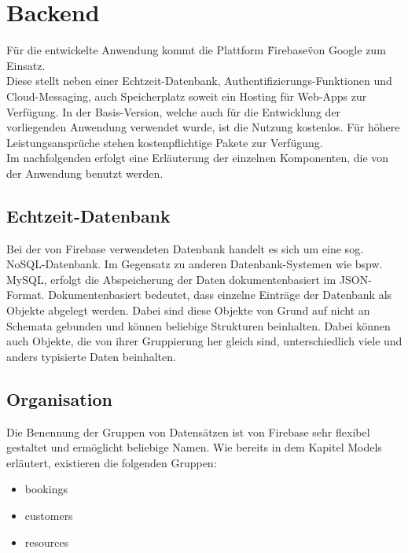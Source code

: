 \chapter{Backend}
Für die entwickelte Anwendung kommt die Plattform \"Firebase\" von Google zum Einsatz.
\\
Diese stellt neben einer Echtzeit-Datenbank, Authentifizierungs-Funktionen und Cloud-Messaging, auch Speicherplatz soweit ein Hosting für Web-Apps zur Verfügung.
In der Basis-Version, welche auch für die Entwicklung der vorliegenden Anwendung verwendet wurde, ist die Nutzung kostenlos. Für höhere Leistungsansprüche stehen kostenpflichtige Pakete zur Verfügung.\\
Im nachfolgenden erfolgt eine Erläuterung der einzelnen Komponenten, die von der Anwendung benutzt werden.

\section{Echtzeit-Datenbank}
Bei der von Firebase verwendeten Datenbank handelt es sich um eine sog. NoSQL-Datenbank. Im Gegensatz zu anderen Datenbank-Systemen wie bspw. MySQL, erfolgt die Abspeicherung der Daten dokumentenbasiert im JSON-Format.
Dokumentenbasiert bedeutet, dass einzelne Einträge der Datenbank als Objekte abgelegt werden. Dabei sind diese Objekte von Grund auf nicht an Schemata gebunden und können beliebige Strukturen beinhalten.
Dabei können auch Objekte, die von ihrer Gruppierung her gleich sind, unterschiedlich viele und anders typisierte Daten beinhalten.\\


\section{Organisation}
Die Benennung der Gruppen von Datensätzen ist von Firebase sehr flexibel gestaltet und ermöglicht beliebige Namen.
Wie bereits in dem Kapitel Models erläutert, existieren die folgenden Gruppen:
\begin{itemize}
\item bookings
\item customers
\item resources
\end{itemize}


